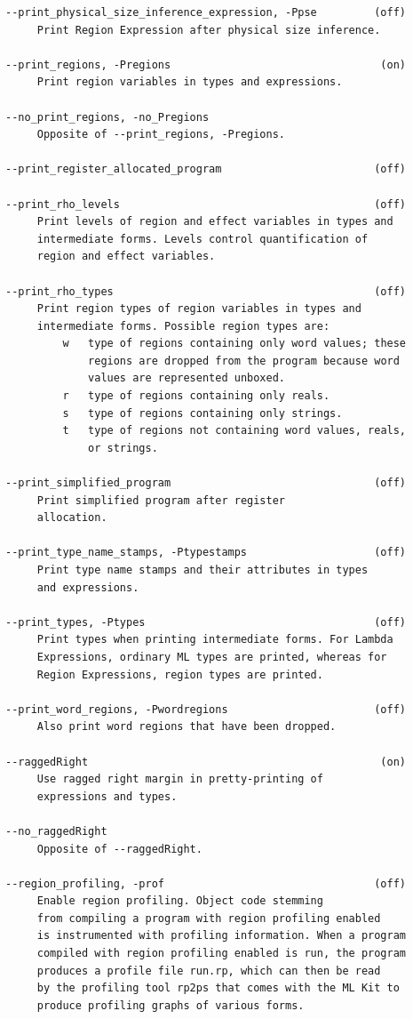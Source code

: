 \documentclass[12pt]{book}
\begin{document}
\begin{verbatim}
--print_physical_size_inference_expression, -Ppse         (off)
     Print Region Expression after physical size inference.

--print_regions, -Pregions                                 (on)
     Print region variables in types and expressions.

--no_print_regions, -no_Pregions
     Opposite of --print_regions, -Pregions.

--print_register_allocated_program                        (off)

--print_rho_levels                                        (off)
     Print levels of region and effect variables in types and
     intermediate forms. Levels control quantification of
     region and effect variables.

--print_rho_types                                         (off)
     Print region types of region variables in types and
     intermediate forms. Possible region types are:
         w   type of regions containing only word values; these
             regions are dropped from the program because word
             values are represented unboxed.
         r   type of regions containing only reals.
         s   type of regions containing only strings.
         t   type of regions not containing word values, reals,
             or strings.

--print_simplified_program                                (off)
     Print simplified program after register
     allocation.

--print_type_name_stamps, -Ptypestamps                    (off)
     Print type name stamps and their attributes in types
     and expressions.

--print_types, -Ptypes                                    (off)
     Print types when printing intermediate forms. For Lambda
     Expressions, ordinary ML types are printed, whereas for
     Region Expressions, region types are printed.

--print_word_regions, -Pwordregions                       (off)
     Also print word regions that have been dropped.

--raggedRight                                              (on)
     Use ragged right margin in pretty-printing of
     expressions and types.

--no_raggedRight
     Opposite of --raggedRight.

--region_profiling, -prof                                 (off)
     Enable region profiling. Object code stemming
     from compiling a program with region profiling enabled
     is instrumented with profiling information. When a program
     compiled with region profiling enabled is run, the program
     produces a profile file run.rp, which can then be read
     by the profiling tool rp2ps that comes with the ML Kit to
     produce profiling graphs of various forms.


\end{verbatim}
\end{document}
